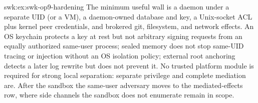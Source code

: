 \begin{pdSolution}{swk:ex:swk-op9-hardening}
The minimum useful wall is a daemon under a separate UID (or a VM), a daemon-owned database and key, a Unix-socket ACL plus kernel peer credentials, and brokered git, filesystem, and network effects. An OS keychain protects a key at rest but not arbitrary signing requests from an equally authorized same-user process; sealed memory does not stop same-UID tracing or injection without an OS isolation policy; external root anchoring detects a later log rewrite but does not prevent it. No trusted platform module is required for strong local separation: separate privilege and complete mediation are. After the sandbox the same-user adversary moves to the mediated-effects row, where side channels the sandbox does not enumerate remain in scope.
\end{pdSolution}
